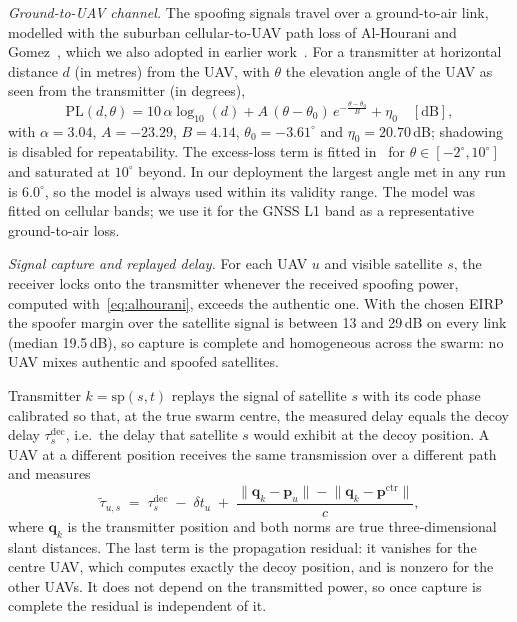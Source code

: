 \documentclass[conference]{IEEEtran}
\newcommand{\ptrue}[1]{\mathbf{p}_{#1}}
\begin{document}
\emph{Ground-to-UAV channel.}
The spoofing signals travel over a ground-to-air link, modelled with the
suburban cellular-to-UAV path loss of Al-Hourani and
Gomez~\cite{alhourani2018cellular}, which we also adopted in earlier
work~\cite{schilleci2025channel}. For a transmitter at horizontal
distance $d$ (in metres) from the UAV, with $\theta$ the elevation angle
of the UAV as seen from the transmitter (in degrees),
\begin{equation}
\mathrm{PL}(d,\theta) = 10\,\alpha\log_{10}(d)
 + A\,(\theta-\theta_0)\,e^{-\frac{\theta-\theta_0}{B}} + \eta_0
 \quad [\mathrm{dB}],
\label{eq:alhourani}
\end{equation}
with $\alpha=3.04$, $A=-23.29$, $B=4.14$, $\theta_0=-3.61^\circ$ and
$\eta_0=20.70$\,dB; shadowing is disabled for repeatability. The
excess-loss term is fitted in~\cite{alhourani2018cellular} for
$\theta\in[-2^\circ,10^\circ]$ and saturated at $10^\circ$ beyond. In
our deployment the largest angle met in any run is $6.0^\circ$, so the
model is always used within its validity range. The model was fitted on
cellular bands; we use it for the GNSS L1 band as a representative
ground-to-air loss.

\emph{Signal capture and replayed delay.}
For each UAV $u$ and visible satellite $s$, the receiver locks onto the
transmitter whenever the received spoofing power, computed
with~\eqref{eq:alhourani}, exceeds the authentic one. With the chosen
EIRP the spoofer margin over the satellite signal is between 13 and
29\,dB on every link (median 19.5\,dB), so capture is complete and
homogeneous across the swarm: no UAV mixes authentic and spoofed
satellites.

Transmitter $k=\mathrm{sp}(s,t)$ replays the signal of satellite $s$
with its code phase calibrated so that, at the true swarm centre, the
measured delay equals the decoy delay $\tau^{\mathrm{dec}}_{s}$, i.e.\
the delay that satellite $s$ would exhibit at the decoy position. A UAV
at a different position receives the same transmission over a different
path and measures
\begin{equation}
\tilde{\tau}_{u,s} \;=\; \tau^{\mathrm{dec}}_{s}\;-\;\delta t_u\;+\;
\frac{\lVert\mathbf{q}_k-\ptrue{u}\rVert-\lVert\mathbf{q}_k-\mathbf{p}^{\mathrm{ctr}}\rVert}{c},
\label{eq:power}
\end{equation}
where $\mathbf{q}_k$ is the transmitter position and both norms are true
three-dimensional slant distances. The last term is the propagation
residual: it vanishes for the centre UAV, which computes exactly the
decoy position, and is nonzero for the other UAVs. It does not depend on
the transmitted power, so once capture is complete the residual is
independent of it.
\end{document}
